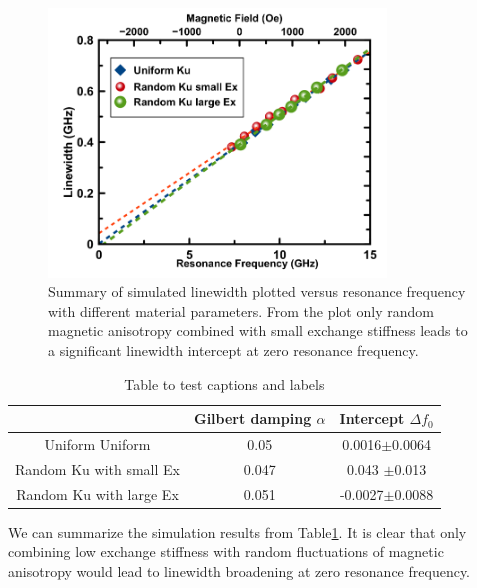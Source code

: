 \begin{figure}[h!]
  \centering
  \includegraphics[width=0.8\textwidth]{fig/CW_sim/LW_summary.png}
  \caption{Summary of simulated linewidth plotted versus resonance frequency with different material parameters. From the plot only random magnetic anisotropy combined with small exchange stiffness leads to a significant linewidth intercept at zero resonance frequency.}
  \label{fig:CW_lw_summary}
\end{figure}


\begin{table}[h!]
\centering
 \begin{tabular}{||c c c||} 
 \hline
  & Gilbert damping $\alpha$  & Intercept $\Delta f_0$\\ [2.0ex] 
 \hline\hline
 Uniform
Uniform  & 0.05 & 0.0016$\pm$0.0064  \\ 
 \hline
 Random Ku with small Ex  & 0.047 & 0.043 $\pm$0.013 \\
 \hline
 Random Ku with large Ex  & 0.051 & -0.0027$\pm$0.0088  \\
 \hline
\end{tabular}
\caption{Table to test captions and labels}
\label{table:summary_LW}
\end{table}

We can summarize the simulation results from Table\ref{table:summary_LW}. It is clear that only combining low exchange stiffness with random fluctuations of magnetic anisotropy would lead to linewidth broadening at zero resonance frequency.

\newpage
